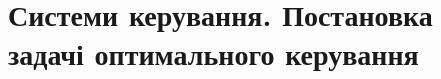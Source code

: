 \documentclass[a4paper, 12pt]{article}
\theoremstyle{definition}
\numberwithin{equation}{section}
\begin{document}
\section{Системи керування. Постановка задачі оптимального керування}






\end{document}
